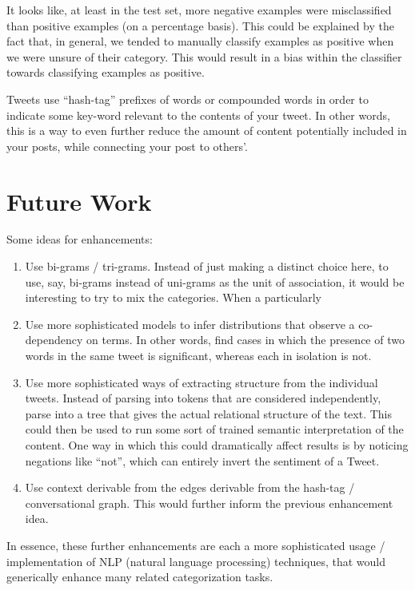 \documentclass[12pt,a4paper]{article}
\begin{document}
It looks like, at least in the test set, more negative examples were misclassified than positive examples (on a percentage basis). This could be explained by the fact that, in general, we tended to manually classify examples as positive when we were unsure of their category. This would result in a bias within the classifier towards classifying examples as positive.

Tweets use ``hash-tag'' prefixes of words or compounded words in order to indicate some key-word relevant to the contents of your tweet.  In other words, this is a way to even further reduce the amount of content potentially included in your posts, while connecting your post to others'.

\section { Future Work }

Some ideas for enhancements:

\begin{enumerate}[1)]
\item Use bi-grams / tri-grams.  Instead of just making a distinct choice here, to use, say, bi-grams instead of uni-grams as the unit of association, it would be interesting to try to mix the categories.  When a particularly 

\item Use more sophisticated models to infer distributions that observe a co-dependency on terms.  In other words, find cases in which the presence of two words in the same tweet is significant, whereas each in isolation is not.

\item Use more sophisticated ways of extracting structure from the individual tweets.  Instead of parsing into tokens that are considered independently, parse into a tree that gives the actual relational structure of the text.  This could then be used to run some sort of trained semantic interpretation of the content.  One way in which this could dramatically affect results is by noticing negations like ``not'', which can entirely invert the sentiment of a Tweet.

\item Use context derivable from the edges derivable from the hash-tag / conversational graph.  This would further inform the previous enhancement idea.
\end{enumerate}

In essence, these further enhancements are each a more sophisticated usage / implementation of NLP (natural language processing) techniques, that would generically enhance many related categorization tasks.
\end{document}
